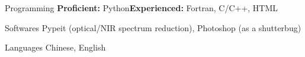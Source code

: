 


\begin{cvskills}


\cvskill
{Programming} %
{\textbf{Proficient:} Python\quad \textbf{Experienced:} Fortran, C/C++, HTML} %



\cvskill
{Softwares} %
{Pypeit (optical/NIR spectrum reduction), Photoshop (as a shutterbug)} %



\cvskill
{Languages} %
{Chinese, English} %

\end{cvskills}